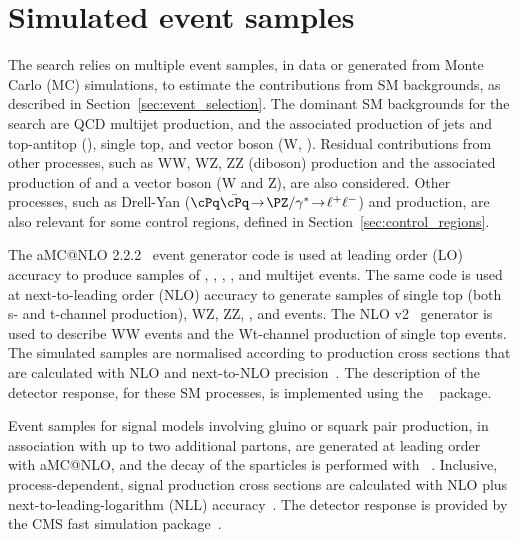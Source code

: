 \section{Simulated event samples}
\label{sec:simulation}

The search relies on multiple event samples, in data or generated from
Monte Carlo (MC) simulations, to estimate the contributions from SM
backgrounds, as described in Section~\ref{sec:event_selection}. 
The dominant SM backgrounds for the search are QCD multijet
production, and the associated production of jets and top-antitop
(\ttbar), single top, and vector boson (W, \znunu). Residual
contributions from other processes, such as WW, WZ, ZZ (diboson)
production and the associated production of \ttbar and a vector boson
(W and Z), are also considered. Other processes, such as Drell-Yan
($\cPq\bar{\cPq}\!  \rightarrow\! \PZ/\gamma^*\! \rightarrow\!
\ell^+\ell^-$) and \gj production, are also relevant for some control
regions, defined in Section~\ref{sec:control_regions}.

The  aMC@NLO 2.2.2~\cite{Alwall2014} event generator code is
used at leading order (LO) accuracy to produce samples of \wj, \zj,
\gj, \ttbar, and multijet events. The same code is used at
next-to-leading order (NLO) accuracy to generate samples of single top
(both s- and t-channel production), WZ, ZZ, \ttw, and \ttz events. The
NLO \POWHEG v2~\cite{powheg, powheg_top_Wt} generator is used to
describe WW events and the Wt-channel production of single top
events. The simulated samples are normalised according to production
cross sections that are calculated with NLO and next-to-NLO
precision~\cite{Alwall2014, wphys, fewz, wwxs, top++, nlotop,
  powheg_top_Wt}. The description of the detector response, for these
SM processes, is implemented using the \GEANTfour~\cite{geant}
package.

Event samples for signal models involving gluino or squark pair
production, in association with up to two additional partons, are
generated at leading order with  aMC@NLO, and the decay of
the sparticles is performed with ~\cite{pythia}. Inclusive,
process-dependent, signal production cross sections are calculated
with NLO plus next-to-leading-logarithm (NLL)
accuracy~\cite{Beenakker:1996ch, PhysRevLett.102.111802,
  PhysRevD.80.095004, 1126-6708-2009-12-041,
  doi:10.1142/S0217751X11053560, susynlo}. The detector response is
provided by the CMS fast simulation package~\cite{fastsim}.

